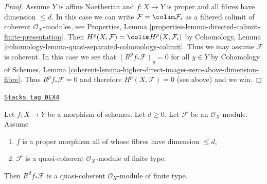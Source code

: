 \begin{proof}
\medskip\noindent
Assume $Y$ is affine Noetherian and $f : X \to Y$ is proper
and all fibres have dimension $\leq d$.
In this case we can write $\mathcal{F} = \colim \mathcal{F}_i$
as a filtered colimit of coherent $\mathcal{O}_X$-modules, see
Properties, Lemma
\ref{properties-lemma-directed-colimit-finite-presentation}.
Then $H^p(X, \mathcal{F}) = \colim H^p(X, \mathcal{F}_i)$ by
Cohomology, Lemma \ref{cohomology-lemma-quasi-separated-cohomology-colimit}.
Thus we may assume $\mathcal{F}$ is coherent.
In this case we see that $(R^pf_*\mathcal{F})_y = 0$ for
all $y \in Y$ by Cohomology of Schemes, Lemma
\ref{coherent-lemma-higher-direct-images-zero-above-dimension-fibre}.
Thus $R^pf_*\mathcal{F} = 0$ and therefore
$H^p(X, \mathcal{F}) = 0$ (see above) and we win.
\end{proof}

\begin{lemma}
\label{limits-lemma-proper-top-cohomology-finite-type}
\href{https://stacks.math.columbia.edu/tag/0EX4}{\texttt{Stacks tag 0EX4}}

Let $f : X \to Y$ be a morphism of schemes. Let $d \geq 0$. Let $\mathcal{F}$
be an $\mathcal{O}_X$-module. Assume
\begin{enumerate}
\item $f$ is a proper morphism all of whose fibres have dimension $\leq d$,
\item $\mathcal{F}$ is a quasi-coherent $\mathcal{O}_X$-module of finite type.
\end{enumerate}
Then $R^df_*\mathcal{F}$ is a quasi-coherent $\mathcal{O}_X$-module
of finite type.
\end{lemma}

